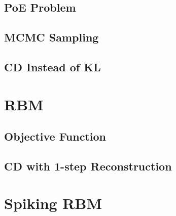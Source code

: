 \documentclass[11pt,twoside,a4paper]{article}
\begin{document}
\subsection{PoE Problem}
\subsection{MCMC Sampling}
\subsection{CD Instead of KL}
\section{RBM\cite{zhang2013rbm}}
\subsection{Objective Function}
\subsection{CD with 1-step Reconstruction}
\section{Spiking RBM\cite{neftci2013event}}

 

\end{document}
